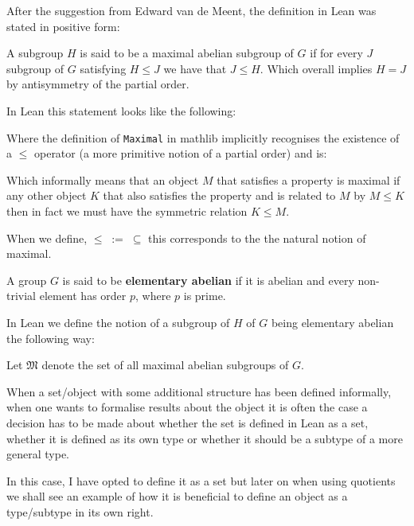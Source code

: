 \begin{remark}
After the suggestion from Edward van de Meent, the definition in Lean was stated in positive form:

A subgroup $H$ is said to be a maximal abelian subgroup of $G$ if for every $J$ subgroup of $G$ satisfying $H \le J$ we have that $J \le H$. Which overall implies $H = J$ by antisymmetry of the partial order.

In Lean this statement looks like the following:




  Where the definition of \texttt{Maximal} in mathlib implicitly recognises the existence of a $\le$ operator (a more primitive notion of a partial order) and is:


  

  Which informally means that an object $M$ that satisfies a property is maximal if any other object $K$ that also satisfies the property and is related to $M$ by $M \le K$ then in fact we must have the symmetric relation $K \le M$.

  When we define, $\le \; := \;  \subseteq$ this corresponds to the the natural notion of maximal.
\end{remark}


\begin{definition}
\label{IsElementaryAbelian}
\leanok
A group $G$ is said to be \textbf{elementary abelian} if it is abelian and every non-trivial element has order $p$, where $p$ is prime.
\end{definition}

\begin{remark}
  In Lean we define the notion of a subgroup of $H$ of $G$ being elementary abelian the following way:

 
\end{remark}

\begin{definition}
\label{MaximalAbelianSubgroupsOf}
\leanok
Let $\mathfrak{M}$ denote the set of all maximal abelian subgroups of $G$.
\end{definition}


\begin{remark}
  When a set/object with some additional structure has been defined informally, when one wants to formalise results about the object it is often the case a decision has to be made
  about whether the set is defined in Lean as a set, whether it is defined as its own type or whether it should be a subtype of a more general type. 
  
  In this case, I have opted to define it as a set but later on when using quotients we shall see an example
  of how it is beneficial to define an object as a type/subtype in its own right.
\end{remark}

